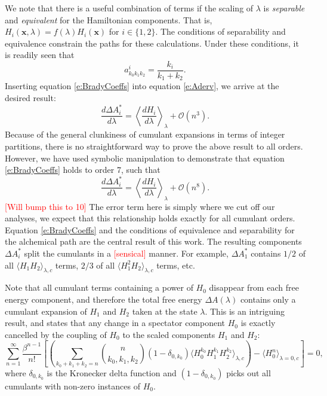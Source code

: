 \documentclass[%
 preprint,
 amsmath,amssymb,
 aps,
]{revtex4-1}
\newcommand{\warning}[1]{{\textsf{{\textcolor{red}{{[#1]}{}}}}}}
\renewcommand{\vec}[1]{{\mathbf{#1}}}
\begin{document}
We note that there is a useful combination of terms if the scaling of $\lambda$ is \emph{separable} and \emph{equivalent} for the Hamiltonian components.  That is, $H_i \left( \vec{x}, \lambda \right) = f(\lambda) H_i \left( \vec{x}\right) $
for $i \in \{1,2\}$.  The conditions of separability and equivalence constrain the paths for these calculations.  Under these conditions, it is readily seen that 
\begin{equation}
a^i_{k_0k_1k_2} = \frac{k_i}{k_1+k_2}. 
\label{e:BradyCoeffs}
\end{equation}
Inserting equation \ref{e:BradyCoeffs} into equation \ref{e:Aderv}, we arrive at the desired result:
\begin{equation}
\frac{d \Delta A^*_i}{d \lambda} =   \left\langle \frac{dH_i}{d \lambda} \right \rangle_{\lambda} + \mathcal{O} (n^3). 
\label{e:BradyProof}
\end{equation}
Because of the general clunkiness of cumulant expansions in terms of integer partitions, there is no straightforward way to prove the above result to all orders.  However, we have used symbolic manipulation to demonstrate that equation \ref{e:BradyCoeffs} holds to order 7, such that
\begin{equation}
\frac{d \Delta A^*_i}{d \lambda} =   \left\langle \frac{dH_i}{d \lambda} \right \rangle_{\lambda} + \mathcal{O} (n^8). 
\label{e:BradyProof2}
\end{equation}
\warning{Will bump this to 10}
The error term here is simply where we cut off our analyses, we expect that this relationship holds exactly for all cumulant orders.  
Equation \ref{e:BradyCoeffs} and the conditions of equivalence and separability for the alchemical path are the central result of this work.  
 The resulting components $\Delta A^*_i$ split the cumulants in a \warning{sensical} manner.  For example, $\Delta A^*_1$ contains $1/2$ of all $\langle  H_1 H_2\rangle_{\lambda,c}$ terms, $2/3$ of all $\langle  H_1^2 H_2\rangle_{\lambda,c}$ terms, etc. 

Note that all cumulant terms containing a power of $H_0$ disappear from each free energy component, and therefore 
the total free energy $\Delta A (\lambda) $ contains only a cumulant expansion of $H_1$ and $H_2$ taken at the state $\lambda$. 
This is an intriguing result, and states that any change in a spectator component $H_0$ is exactly cancelled by the coupling of $H_0$ to the scaled components $H_1$ and $H_2$:
 \begin{equation}
\sum_{n=1}^{\infty}  \frac{\beta^{n-1}}{n!} 
\left[
\left(
 \sum_{k_0+k_1+k_2=n} 
{ n \choose k_0,k_1,k_2 } \left( 1- \delta_{0,k_0}  \right) \langle  H_0^{k_0} H_1^{k_1} H_2^{k_2} \rangle_{\lambda,c}
\right)
-  \langle  H_0^{n}  \rangle_{\lambda=0,c} \right] = 0,
\label{e:SpectatorCancellation}
\end{equation}
where $\delta_{0,k_0} $ is the Kronecker delta function and $ \left( 1- \delta_{0,k_0}  \right)$ picks out all cumulants with non-zero instances of $H_0$. 
\end{document}

